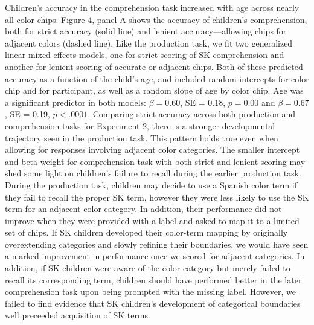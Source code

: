 \documentclass[,man,floatsintext]{apa6}
\theoremstyle{definition}
\theoremstyle{definition}
\theoremstyle{definition}
\theoremstyle{remark}
\begin{document}
Children's accuracy in the comprehension task increased with age across
nearly all color chips. Figure 4, panel A shows the accuracy of
children's comprehension, both for strict accuracy (solid line) and
lenient accuracy---allowing chips for adjacent colors (dashed line).
Like the production task, we fit two generalized linear mixed effects
models, one for strict scoring of SK comprehension and another for
lenient scoring of accurate or adjacent chips. Both of these predicted
accuracy as a function of the child's age, and included random
intercepts for color chip and for participant, as well as a random slope
of age by color chip. Age was a significant predictor in both models:
\(\beta = 0.60\), SE = 0.18, \(p = 0.00\) and \(\beta = 0.67\), SE =
0.19, \(p < .0001\). Comparing strict accuracy across both production
and comprehension tasks for Experiment 2, there is a stronger
developmental trajectory seen in the production task. This pattern holds
true even when allowing for responses involving adjacent color
categories. The smaller intercept and beta weight for comprehension task
with both strict and lenient scoring may shed some light on children's
failure to recall during the earlier production task. During the
production task, children may decide to use a Spanish color term if they
fail to recall the proper SK term, however they were less likely to use
the SK term for an adjacent color category. In addition, their
performance did not improve when they were provided with a label and
asked to map it to a limited set of chips. If SK children developed
their color-term mapping by originally overextending categories and
slowly refining their boundaries, we would have seen a marked
improvement in performance once we scored for adjacent categories. In
addition, if SK children were aware of the color category but merely
failed to recall its corresponding term, children should have performed
better in the later comprehension task upon being prompted with the
missing label. However, we failed to find evidence that SK children's
development of categorical boundaries well preceeded acquisition of SK
terms.
\end{document}
